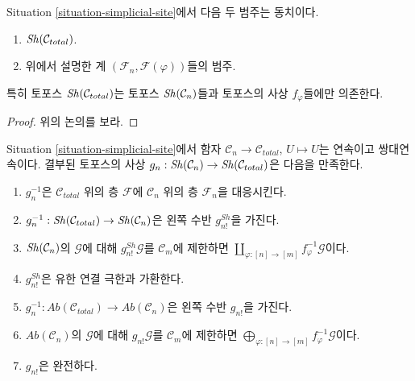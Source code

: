 \begin{lemma}
\label{lemma-describe-sheaves-simplicial-site-site}
Situation \ref{situation-simplicial-site}에서 다음 두 범주는 동치이다.
\begin{enumerate}
\item $\mathop{\mathit{Sh}}\nolimits(\mathcal{C}_{total})$.
\item 위에서 설명한 계 $(\mathcal{F}_n, \mathcal{F}(\varphi))$들의 범주.
\end{enumerate}
특히 토포스 $\mathop{\mathit{Sh}}\nolimits(\mathcal{C}_{total})$는 토포스
$\mathop{\mathit{Sh}}\nolimits(\mathcal{C}_n)$들과 토포스의 사상 $f_\varphi$들에만 의존한다.
\end{lemma}

\begin{proof}
위의 논의를 보라.
\end{proof}

\begin{lemma}
\label{lemma-restriction-to-components-site}
Situation \ref{situation-simplicial-site}에서 함자
$\mathcal{C}_n \to \mathcal{C}_{total}$, $U \mapsto U$는
연속이고 쌍대연속이다. 결부된 토포스의 사상
$g_n : \mathop{\mathit{Sh}}\nolimits(\mathcal{C}_n) \to \mathop{\mathit{Sh}}\nolimits(\mathcal{C}_{total})$은
다음을 만족한다.
\begin{enumerate}
\item $g_n^{-1}$은 $\mathcal{C}_{total}$ 위의 층 $\mathcal{F}$에
$\mathcal{C}_n$ 위의 층 $\mathcal{F}_n$을 대응시킨다.
\item $g_n^{-1} : \mathop{\mathit{Sh}}\nolimits(\mathcal{C}_{total}) \to \mathop{\mathit{Sh}}\nolimits(\mathcal{C}_n)$은
왼쪽 수반 $g^{Sh}_{n!}$을 가진다.
\item $\mathop{\mathit{Sh}}\nolimits(\mathcal{C}_n)$의 $\mathcal{G}$에 대해
$g_{n!}^{Sh}\mathcal{G}$를 $\mathcal{C}_m$에 제한하면
$\coprod\nolimits_{\varphi : [n] \to [m]} f_\varphi^{-1}\mathcal{G}$이다.
\item $g_{n!}^{Sh}$은 유한 연결 극한과 가환한다.
\item $g_n^{-1} : \textit{Ab}(\mathcal{C}_{total}) \to
\textit{Ab}(\mathcal{C}_n)$은 왼쪽 수반 $g_{n!}$을 가진다.
\item $\textit{Ab}(\mathcal{C}_n)$의 $\mathcal{G}$에 대해
$g_{n!}\mathcal{G}$를 $\mathcal{C}_m$에 제한하면
$\bigoplus\nolimits_{\varphi : [n] \to [m]} f_\varphi^{-1}\mathcal{G}$이다.
\item $g_{n!}$은 완전하다.
\end{enumerate}
\end{lemma}

